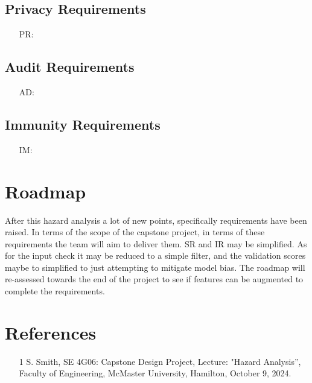 \documentclass{article}
\newcounter{prnum} %
\newcounter{adnum} %
\newcounter{imnum} %
\begin{document}
\subsection{Privacy Requirements}
\begin{itemize}
    \item [PR\refstepcounter{prnum}\theprnum \label{PR_}:] 
\end{itemize}

\subsection{Audit Requirements}
\begin{itemize}
    \item [AD\refstepcounter{adnum}\theadnum \label{AD_}:] 
\end{itemize}


\subsection{Immunity Requirements}
\begin{itemize}
    \item [IM\refstepcounter{imnum}\theimnum \label{IM_}:] 
\end{itemize}


\section{Roadmap}


After this hazard analysis a lot of new points, specifically requirements have been raised. In terms of the scope of the capstone project, in terms of these requirements the team will aim to deliver them. SR\label{SR_InputCheck} and IR\label{IR_ValidationScore} may be simplified. As for the input check it may be reduced to a simple filter, and the validation scores maybe to simplified to just attempting to mitigate model bias. The roadmap will re-assessed towards the end of the project to see if features can be augmented to complete the requirements.
\newpage{}

\section{References}

\begin{itemize}
    \item [1] S. Smith, SE 4G06: Capstone Design Project, Lecture: "Hazard Analysis”, Faculty of Engineering, McMaster University, Hamilton, October 9, 2024.
\end{itemize}
\end{document}
